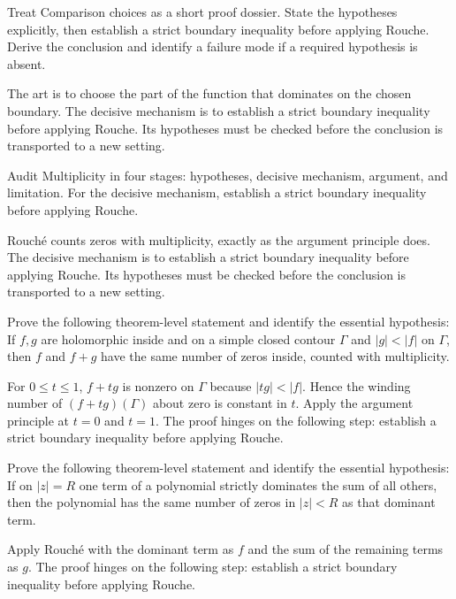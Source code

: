 \begin{problem}\label{prob:iv13-problem-07}
Treat Comparison choices as a short proof dossier. State the hypotheses explicitly, then establish a strict boundary inequality before applying Rouche. Derive the conclusion and identify a failure mode if a required hypothesis is absent.
\end{problem}
\begin{solution}
The art is to choose the part of the function that dominates on the chosen boundary. The decisive mechanism is to establish a strict boundary inequality before applying Rouche. Its hypotheses must be checked before the conclusion is transported to a new setting.
\end{solution}

\begin{problem}\label{prob:iv13-problem-08}
Audit Multiplicity in four stages: hypotheses, decisive mechanism, argument, and limitation. For the decisive mechanism, establish a strict boundary inequality before applying Rouche.
\end{problem}
\begin{solution}
Rouché counts zeros with multiplicity, exactly as the argument principle does. The decisive mechanism is to establish a strict boundary inequality before applying Rouche. Its hypotheses must be checked before the conclusion is transported to a new setting.
\end{solution}

\begin{problem}\label{prob:iv13-problem-09}
Prove the following theorem-level statement and identify the essential hypothesis: If $f,g$ are holomorphic inside and on a simple closed contour $\Gamma$ and $|g|<|f|$ on $\Gamma$, then $f$ and $f+g$ have the same number of zeros inside, counted with multiplicity.
\end{problem}
\begin{solution}
For $0\le t\le1$, $f+tg$ is nonzero on $\Gamma$ because $|tg|<|f|$. Hence the winding number of $(f+tg)(\Gamma)$ about zero is constant in $t$. Apply the argument principle at $t=0$ and $t=1$. The proof hinges on the following step: establish a strict boundary inequality before applying Rouche.
\end{solution}

\begin{problem}\label{prob:iv13-problem-10}
Prove the following theorem-level statement and identify the essential hypothesis: If on $|z|=R$ one term of a polynomial strictly dominates the sum of all others, then the polynomial has the same number of zeros in $|z|<R$ as that dominant term.
\end{problem}
\begin{solution}
Apply Rouché with the dominant term as $f$ and the sum of the remaining terms as $g$. The proof hinges on the following step: establish a strict boundary inequality before applying Rouche.
\end{solution}

